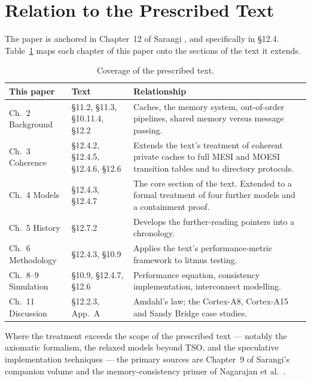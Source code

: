 \section{Relation to the Prescribed Text}
\label{sec:relation}

The paper is anchored in Chapter~12 of Sarangi \cite{sarangi2025basic}, and
specifically in \S12.4.
Table~\ref{tab:coverage} maps each chapter of this paper
onto the sections of the text it extends.

\begin{table}[H]
\centering
\small
\caption{Coverage of the prescribed text.}
\label{tab:coverage}
\begin{tabular}{@{}llp{6.1cm}@{}}
\toprule
\textbf{This paper} & \textbf{Text} & \textbf{Relationship} \\
\midrule
Ch.~2 Background   & \S11.2, \S11.3, \S10.11.4, \S12.2 &
  Caches, the memory system, out-of-order pipelines, shared memory versus
  message passing. \\
Ch.~3 Coherence    & \S12.4.2, \S12.4.5, \S12.4.6, \S12.6 &
  Extends the text's treatment of coherent private caches to full MESI and
  MOESI transition tables and to directory protocols. \\
Ch.~4 Models       & \S12.4.3, \S12.4.7 &
  The core section of the text. Extended to a formal treatment of four further
  models and a containment proof. \\
Ch.~5 History      & \S12.7.2 &
  Develops the further-reading pointers into a chronology. \\
Ch.~6 Methodology  & \S12.4.3, \S10.9 &
  Applies the text's performance-metric framework to litmus testing. \\
Ch.~8--9 Simulation & \S10.9, \S12.4.7, \S12.6 &
  Performance equation, consistency implementation, interconnect modelling. \\
Ch.~11 Discussion  & \S12.2.3, App.~A &
  Amdahl's law; the Cortex-A8, Cortex-A15 and Sandy Bridge case studies. \\
\bottomrule
\end{tabular}
\end{table}

Where the treatment exceeds the scope of the prescribed text --- notably the
axiomatic formalism, the relaxed models beyond TSO, and the speculative
implementation techniques --- the primary sources are Chapter~9 of Sarangi's
companion volume \cite{sarangi2023nextgen} and the memory-consistency primer of
Nagarajan et al.\ \cite{nagarajan2020primer}.

